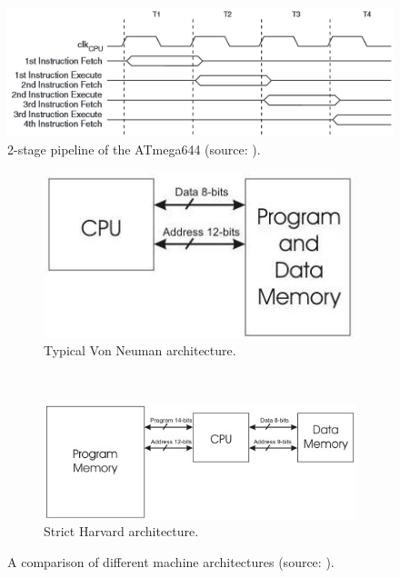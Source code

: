 	\begin{figure}
		\center
		\includegraphics[scale=0.7]{img/pipeline.png}
		\caption{\footnotesize 2-stage pipeline of the ATmega644 (source: \protect\citep{atmega_manual}).}
		\label{fig:pipeline}		
	\end{figure}
	
\begin{figure}
	\begin{subfigure}{0.5\textwidth}
		\center
		\includegraphics[scale=0.5]{img/von_neuman_arch.jpg}
		\caption{\footnotesize Typical Von Neuman architecture.}
		\label{fig:VN_arch}
	\end{subfigure} 
	~
	\begin{subfigure}{0.5\textwidth}
		\center
		\includegraphics[scale=0.5]{img/harvard_arch.jpeg}
		\caption{\footnotesize Strict Harvard architecture.}
		\label{fig:H_arch}
	\end{subfigure}
	\caption{\footnotesize A comparison of different machine architectures (source: \protect\citep{website:mcu_primer}).}
	\label{fig:architectures}
\end{figure}	
	
